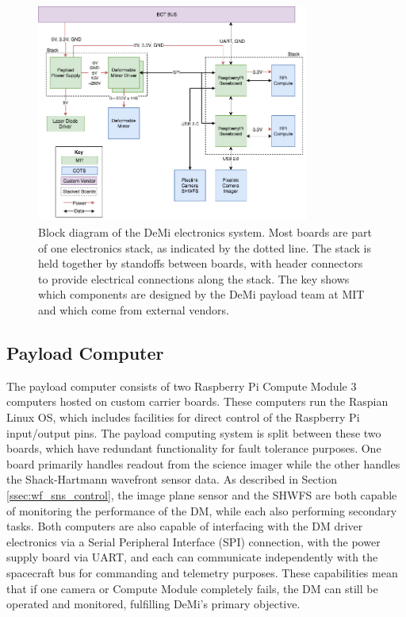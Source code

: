 \documentclass[]{spie}  %
\begin{document}
\begin{figure}
\centering
\includegraphics[width=0.80\textwidth]{DeMi_Electronics_Diagram}
\smallskip
\caption{\label{fig:demi_electronics}Block diagram of the DeMi electronics system. Most boards are part of one electronics stack, as indicated by the dotted line. The stack is held together by standoffs between boards, with header connectors to provide electrical connections along the stack. The key shows which components are designed by the DeMi payload team at MIT and which come from external vendors.}
\end{figure}

\subsection{Payload Computer} %
The payload computer consists of two Raspberry Pi Compute Module 3  computers hosted on custom carrier boards. These computers run the Raspian Linux OS, which includes facilities for direct control of the Raspberry Pi input/output pins. The payload computing system is split between these two boards, which have redundant functionality for fault tolerance purposes. One board primarily handles readout from the science imager while the other handles the Shack-Hartmann wavefront sensor data. As described in Section \ref{ssec:wf_sns_control}, the image plane sensor and the SHWFS are both capable of monitoring the performance of the DM, while each also performing secondary tasks.  Both computers are also capable of interfacing with the DM driver electronics via a Serial Peripheral Interface (SPI) connection, with the power supply board via UART, and each can communicate independently with the spacecraft bus for commanding and telemetry purposes. These capabilities mean that if one camera or Compute Module completely fails, the DM can still be operated and monitored, fulfilling DeMi's primary objective.
\end{document}
